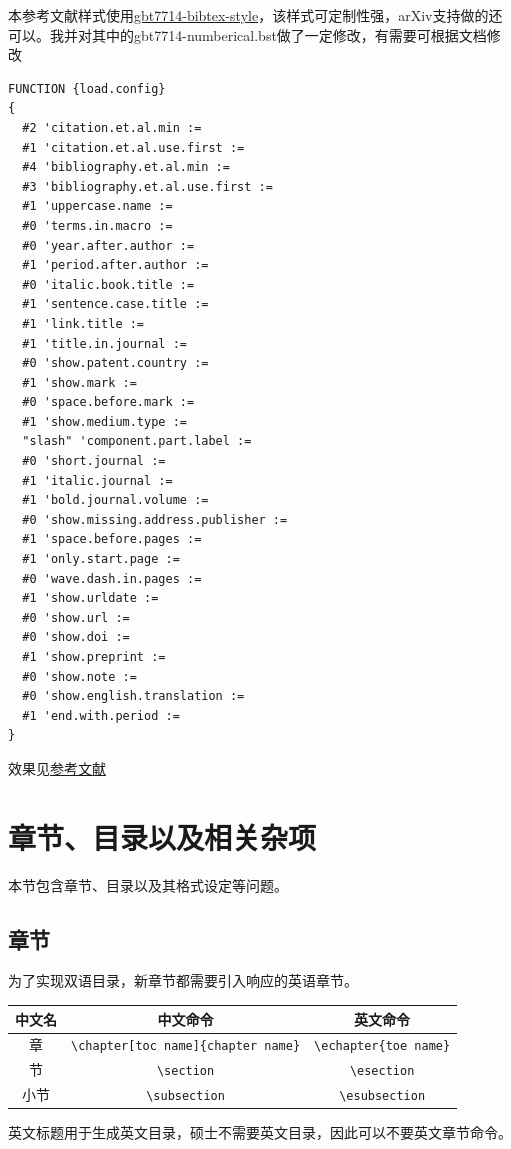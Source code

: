 本参考文献样式使用\hyperlink{https://github.com/zepinglee/gbt7714-bibtex-style}
{gbt7714-bibtex-style}，该样式可定制性强，arXiv支持做的还可以。我并对其中的gbt7714-numberical.bst做了一定修改，有需要可根据文档修改
\begin{lstlisting}[language=TeX]
FUNCTION {load.config}
{
  #2 'citation.et.al.min :=
  #1 'citation.et.al.use.first :=
  #4 'bibliography.et.al.min :=
  #3 'bibliography.et.al.use.first :=
  #1 'uppercase.name :=
  #0 'terms.in.macro :=
  #0 'year.after.author :=
  #1 'period.after.author :=
  #0 'italic.book.title :=
  #1 'sentence.case.title :=
  #1 'link.title :=
  #1 'title.in.journal :=
  #0 'show.patent.country :=
  #1 'show.mark :=
  #0 'space.before.mark :=
  #1 'show.medium.type :=
  "slash" 'component.part.label :=
  #0 'short.journal :=
  #1 'italic.journal :=
  #1 'bold.journal.volume :=
  #0 'show.missing.address.publisher :=
  #1 'space.before.pages :=
  #1 'only.start.page :=
  #0 'wave.dash.in.pages :=
  #1 'show.urldate :=
  #0 'show.url :=
  #0 'show.doi :=
  #1 'show.preprint :=
  #0 'show.note :=
  #0 'show.english.translation :=
  #1 'end.with.period :=
}
\end{lstlisting}
效果见\hyperref[cha:reference]{参考文献}
\section{章节、目录以及相关杂项}
\label{sec:Chapter-section-contents-others}
本节包含章节、目录以及其格式设定等问题。
\subsection{章节}
%
\label{sub:chapter-section}
为了实现双语目录，新章节都需要引入响应的英语章节。
\begin{table}[h]
    \centering
    \begin{tabular*}{0.85\textwidth}{@{\extracolsep{\fill}}ccc}
	\hline
     中文名& 中文命令 & 英文命令 \\ \hline
     章 & \verb|\chapter[toc name]{chapter name}| & \verb|\echapter{toe name}| \\ \hline
     节 & \verb|\section| & \verb|\esection| \\ \hline
     小节 & \verb|\subsection| & \verb|\esubsection| \\ \hline
    \end{tabular*}
\end{table}
英文标题用于生成英文目录，硕士不需要英文目录，因此可以不要英文章节命令。

